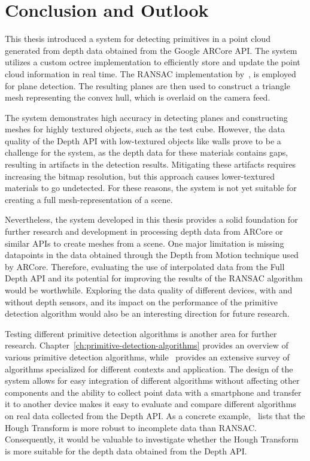 \chapter{Conclusion and Outlook}

This thesis introduced a system for detecting primitives in a point cloud generated from depth data obtained from the Google ARCore API.
The system utilizes a custom octree implementation to efficiently store and update the point cloud information in real time.
The RANSAC implementation by~\cite{schnabel_efficient_2007}, is employed for plane detection.
The resulting planes are then used to construct a triangle mesh representing the convex hull,
which is overlaid on the camera feed.

The system demonstrates high accuracy in detecting planes and constructing meshes for highly textured objects,
such as the test cube.
However, the data quality of the Depth API with low-textured objects like walls prove to be a challenge for the system,
as the depth data for these materials contains gaps, resulting in artifacts in the detection results.
Mitigating these artifacts requires increasing the bitmap resolution, but this approach causes lower-textured materials to go undetected.
For these reasons, the system is not yet suitable for creating a full mesh-representation of a scene.

Nevertheless, the system developed in this thesis provides a solid foundation for further research and development in processing depth data from ARCore or similar APIs to create meshes from a scene.
One major limitation is missing datapoints in the data obtained through the Depth from Motion technique used by ARCore.
Therefore, evaluating the use of interpolated data from the Full Depth API and its potential for improving the results of the RANSAC algorithm would be worthwhile.
Exploring the data quality of different devices, with and without depth sensors, and its impact on the performance of
the primitive detection algorithm would also be an interesting direction for future research.

Testing different primitive detection algorithms is another area for further research.
Chapter~\ref{ch:primitive-detection-algorithms} provides an overview of various primitive detection algorithms,
while~\cite{kaiser_survey_2019} provides an extensive survey of algorithms specialized for different contexts and application.
The design of the system allows for easy integration of different algorithms without affecting other components and
the ability to collect point data with a smartphone and transfer it to another device makes it easy
to evaluate and compare different algorithms on real data collected from the Depth API\@.
As a concrete example,~\cite{kaiser_survey_2019} lists that the Hough Transform is more robust to incomplete data than RANSAC\@.
Consequently, it would be valuable to investigate whether the Hough Transform is more suitable for the depth data
obtained from the Depth API\@.

